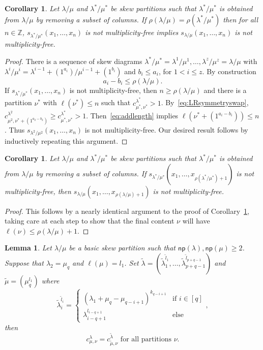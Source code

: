 \documentclass[10pt]{article}
\newtheorem{lemma}[theorem]{Lemma}
\newtheorem{coro}[theorem]{Corollary}
\theoremstyle{definition}
\newcommand{\np}{\mathsf{np}}
\newcommand\integers{{\mathbb Z}}
\begin{document}
\begin{coro}\label{Cor:GUT}
Let $\lambda/\mu$ and $\lambda^{*}/\mu^{*}$ be skew partitions such that $\lambda^{*}/\mu^{*}$ is obtained from $\lambda/\mu$ by removing a subset of columns. If $\rho(\lambda/\mu) = \rho(\lambda^{*}/\mu^{*})$ then for all $n\in \integers$, $s_{\lambda^{*}/\mu^{*}}(x_1,\ldots,x_n)$ is not multiplicity-free implies $s_{\lambda/\mu}(x_1,\ldots,x_n)$ is not multiplicity-free.
\end{coro}
\begin{proof} There is a sequence of skew diagrams $\lambda^{*}/\mu^{*}=\lambda^1/\mu^1,\ldots,\lambda^z/\mu^z=\lambda/\mu$ with $\lambda^i / \mu^i = \lambda^{i-1} + (1^{a_i}) / \mu^{i-1} + (1^{b_i})$ and $b_i \leq a_i$, for $1<i\leq z$. By construction
\begin{equation}
\label{eq:addlength}
a_i - b_i \leq \rho(\lambda/\mu).
\end{equation}
If $s_{\lambda^{*}/\mu^{*}}(x_1,\ldots,x_n)$ is not multiplicity-free, then $n \geq \rho(\lambda/\mu)$ and there is a partition $\nu^{*}$ with $\ell(\nu^{*}) \leq n$ such that $c^{\lambda^{*}}_{\mu^{*},\nu^{*}} > 1$. By~\eqref{eq:LRsymmetryswap}, $c^{\lambda^2}_{\mu^2,\nu^{*} + (1^{a_2 - b_2}) } \geq c^{\lambda^{*}}_{\mu^{*},\nu^{*}} > 1$. Then~\eqref{eq:addlength} implies $\ell(\nu^{*} + (1^{a_i - b_i})) \leq n$. Thus $s_{\lambda^2/\mu^2}(x_1,\ldots,x_n)$ is not multiplicity-free. Our desired result follows by inductively repeating this argument.
\end{proof}

\begin{coro}\label{Cor:GUT2}
Let $\lambda/\mu$ and $\lambda^{*}/\mu^{*}$ be skew partitions such that $\lambda^{*}/\mu^{*}$ is obtained from $\lambda/\mu$ by removing a subset of columns. If $s_{\lambda^{*}/\mu^{*}}(x_1,\ldots,x_{\rho(\lambda^{*}/\mu^{*}) + 1})$ is not multiplicity-free, then $s_{\lambda/\mu}(x_1,\ldots,x_{\rho(\lambda/\mu)+1})$ is not multiplicity-free.
\end{coro}
\begin{proof}
This follows by a nearly identical argument to the proof of Corollary~\ref{Cor:GUT}, taking care at each step to show that the final content $\nu$ will have $\ell(\nu) \leq \rho(\lambda/\mu) + 1$.
\end{proof}

\begin{lemma}\label{Lemma:switchingcol}
 Let $\lambda/\mu$ be a basic skew partition such that ${\np }(\lambda),{\np }(\mu)\geq 2$. Suppose that $\lambda_2 = \mu_q$ and $\ell(\mu) = l_1$. Set $\tilde\lambda = (\tilde\lambda_1^{\tilde l_1}, \ldots, \tilde\lambda_{p+q-1}^{\tilde l_{p+q-1}})$ and $\tilde\mu = (\mu_q^{l_1})$ where 
 \[
\tilde\lambda_i^{\tilde l_i} = 
 \begin{cases}
 (\lambda_1+\mu_q-\mu_{q-i+1})^{k_{q-i+1}} & \text{if }i\in [q]\\
 \lambda_{i-q+1}^{l_{i-q+1}} & \text{else}
 \end{cases},
\] 
then
 \[
c^{\lambda}_{\mu,\nu} = c^{\tilde\lambda}_{\tilde\mu,\nu} \text{ for all partitions $\nu$}.
\]
 
\end{lemma}
\end{document}
